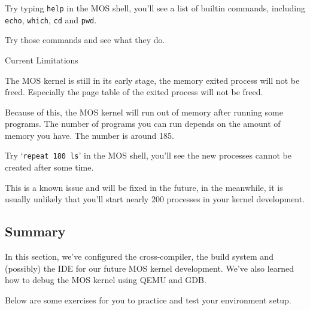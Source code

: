 \begin{exercise}
    \item Try typing \texttt{help} in the MOS shell, you'll see a list of builtin
    commands, including \texttt{echo}, \texttt{which}, \texttt{cd} and \texttt{pwd}.
    \item Try those commands and see what they do.
\end{exercise}

\begin{note*}{Current Limitations}
    \item The MOS kernel is still in its early stage, the memory exited process will
    not be freed. Especially the page table of the exited process will not be freed.
    \item Because of this, the MOS kernel will run out of memory after running some programs.
    The number of programs you can run depends on the amount of memory you have. The number
    is around 185.

    \item Try `\texttt{repeat 180 ls}' in the MOS shell, you'll see the new processes
    cannot be created after some time.

    \item This is a known issue and will be fixed in the future, in the meanwhile, it is
    usually unlikely that you'll start nearly 200 processes in your kernel development.
\end{note*}

\subsection{Summary}

In this section, we've configured the cross-compiler, the build system and (possibly) the IDE for
our future MOS kernel development. We've also learned how to debug the MOS kernel using QEMU and GDB.

Below are some exercises for you to practice and test your environment setup.


